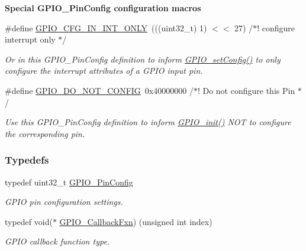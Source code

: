 \begin{Indent}{\bf Special G\+P\+I\+O\+\_\+\+Pin\+Config configuration macros}\par
\begin{DoxyCompactItemize}
\item 
\#define \hyperlink{_g_p_i_o_8h_ac8df4b49e09cb612275ed7d00e8cc1cf}{G\+P\+I\+O\+\_\+\+C\+F\+G\+\_\+\+I\+N\+\_\+\+I\+N\+T\+\_\+\+O\+N\+L\+Y}~(((uint32\+\_\+t) 1) $<$$<$ 27)                  /$\ast$! configure interrupt only $\ast$/
\begin{DoxyCompactList}\small\item\em \textquotesingle{}Or\textquotesingle{} in this G\+P\+I\+O\+\_\+\+Pin\+Config definition to inform \hyperlink{_g_p_i_o_8h_ae13b9ae70c5d2993d1ac932a91c1f1fa}{G\+P\+I\+O\+\_\+set\+Config()} to only configure the interrupt attributes of a G\+P\+I\+O input pin. \end{DoxyCompactList}\item 
\#define \hyperlink{_g_p_i_o_8h_a0974eb3af57b7bccef9ac749d4cf23a7}{G\+P\+I\+O\+\_\+\+D\+O\+\_\+\+N\+O\+T\+\_\+\+C\+O\+N\+F\+I\+G}~0x40000000                              /$\ast$! Do not configure this Pin $\ast$/
\begin{DoxyCompactList}\small\item\em Use this G\+P\+I\+O\+\_\+\+Pin\+Config definition to inform \hyperlink{_g_p_i_o_8h_a7aaec489dca5ac4d278d2eb3ae38a2d2}{G\+P\+I\+O\+\_\+init()} N\+O\+T to configure the corresponding pin. \end{DoxyCompactList}\end{DoxyCompactItemize}
\end{Indent}
\subsubsection*{Typedefs}
\begin{DoxyCompactItemize}
\item 
typedef uint32\+\_\+t \hyperlink{_g_p_i_o_8h_a7f5d979226db633309b3fdc0f4a8aef6}{G\+P\+I\+O\+\_\+\+Pin\+Config}
\begin{DoxyCompactList}\small\item\em G\+P\+I\+O pin configuration settings. \end{DoxyCompactList}\item 
typedef void($\ast$ \hyperlink{_g_p_i_o_8h_a7814871ec922ed619c98b8e8c323372c}{G\+P\+I\+O\+\_\+\+Callback\+Fxn}) (unsigned int index)
\begin{DoxyCompactList}\small\item\em G\+P\+I\+O callback function type. \end{DoxyCompactList}\end{DoxyCompactItemize}
